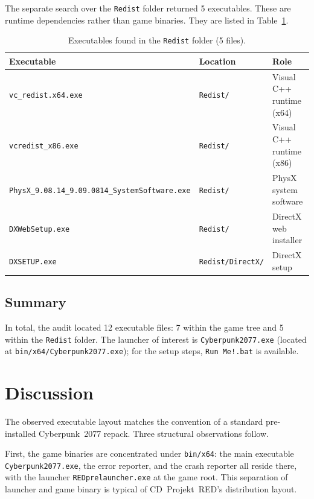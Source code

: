 \documentclass[11pt]{article}
\begin{document}
The separate search over the \texttt{Redist} folder returned 5 executables.
These are runtime dependencies rather than game binaries. They are listed in
Table~\ref{tab:redist}.

\begin{table}[htbp]
\centering
\caption{Executables found in the \texttt{Redist} folder (5 files).}
\label{tab:redist}
\begin{tabular}{@{}lll@{}}
\toprule
\textbf{Executable} & \textbf{Location} & \textbf{Role} \\
\midrule
\texttt{vc\_redist.x64.exe} & \texttt{Redist/} & Visual C++ runtime (x64) \\
\texttt{vcredist\_x86.exe} & \texttt{Redist/} & Visual C++ runtime (x86) \\
\texttt{PhysX\_9.08.14\_9.09.0814\_SystemSoftware.exe} & \texttt{Redist/} & PhysX system software \\
\texttt{DXWebSetup.exe} & \texttt{Redist/} & DirectX web installer \\
\texttt{DXSETUP.exe} & \texttt{Redist/DirectX/} & DirectX setup \\
\bottomrule
\end{tabular}
\end{table}

\subsection{Summary}
\label{sec:summary}

In total, the audit located 12 executable files: 7 within the game tree and 5
within the \texttt{Redist} folder. The launcher of interest is
\texttt{Cyberpunk2077.exe} (located at \texttt{bin/x64/Cyberpunk2077.exe});
for the setup steps, \texttt{Run Me!.bat} is available.

\section{Discussion}
\label{sec:discussion}

The observed executable layout matches the convention of a standard
pre-installed Cyberpunk~2077 repack. Three structural observations follow.

First, the game binaries are concentrated under \texttt{bin/x64}: the main
executable \texttt{Cyberpunk2077.exe}, the error reporter, and the crash
reporter all reside there, with the launcher \texttt{REDprelauncher.exe} at the
game root. This separation of launcher and game binary is typical of
CD~Projekt~RED's distribution layout.
\end{document}
